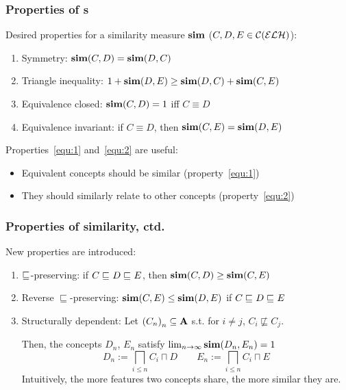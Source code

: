 \documentclass[smaller, dvipsnames]{beamer}
\newcounter{simprop}
\newcommand{\propstop}{\setcounter{simprop}{\theenumi}}
\newcommand{\propplay}{\setcounter{enumi}{\thesimprop}}
\begin{document}
\begin{frame}
  \frametitle{Properties of \csm{}s}
  Desired properties for a 
  \alert{similarity measure} \(\operatorname{\mathbf{sim}}\) (\(C,D,E \in \mathcal{C}(\mathcal{ELH})\)):
  \begin{enumerate}[<+->]
    \item \alert{Symmetry}: \(\operatorname{\mathbf{sim}}(C,D) = \operatorname{\mathbf{sim}}(D,C)\)
    \item \alert{Triangle inequality}:
      \(1 + \operatorname{\mathbf{sim}}(D,E) \ge \operatorname{\mathbf{sim}}(D,C) + \operatorname{\mathbf{sim}}(C,E)\)
    \item\label{equ:1} \alert{Equivalence closed}:
      \(\operatorname{\mathbf{sim}}(C,D) = 1\) iff \(C \equiv D\)
    \item\label{equ:2} \alert{Equivalence invariant}:
      if \(C \equiv D\), then
      \(\operatorname{\mathbf{sim}}(C,E) = \operatorname{\mathbf{sim}}(D,E)\)
    \propstop
  \end{enumerate}
  \onslide<+->
  Properties~\ref{equ:1} and~\ref{equ:2} are useful:
  \begin{itemize}
    \item Equivalent concepts should be similar (property~\ref{equ:1})
    \item They should similarly relate to other concepts (property~\ref{equ:2})
  \end{itemize}
\end{frame}

\begin{frame}
  \frametitle{Properties of similarity, ctd.}
  New properties are introduced:
  \begin{enumerate}[<+->]
    \propplay
    \item \alert{\(\sqsubseteq_{\mathcal{}}\)-preserving}: if \(C \sqsubseteq_{\mathcal{}} D \sqsubseteq_{\mathcal{}} E\),
    then \(\operatorname{\mathbf{sim}}(C,D) \ge \operatorname{\mathbf{sim}}(C,E)\)
    \item \alert{Reverse \(\sqsubseteq\)-preserving}: 
    \(\operatorname{\mathbf{sim}}(C,E) \le \operatorname{\mathbf{sim}}(D,E)\) if
    \(C \sqsubseteq_{\mathcal{}} D \sqsubseteq_{\mathcal{}} E\)
    \item \alert{Structurally dependent}: 
    Let \({(C_n)}_n \subseteq \mathbf{A}\) s.t. for \(i \ne j\),
    \(C_i \not\sqsubseteq C_j\).
    
    Then, the concepts
    \(D_n\), \(E_n\) satisfy
    \(\lim_{n \to \infty} \operatorname{\mathbf{sim}}(D_n,E_n) = 1\)
    \begin{equation*}
      D_n := \bigsqcap_{i \le n} C_i \sqcap D \qquad
      E_n := \bigsqcap_{i \le n} C_i \sqcap E
    \end{equation*}
    Intuitively, the more \alert{features}
    two concepts share, the more similar they are.
  \end{enumerate}
\end{frame}
\end{document}
